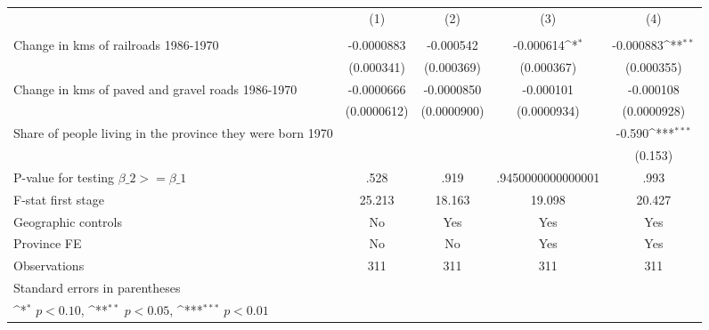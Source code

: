 {
\def\sym#1{\ifmmode^{#1}\else\(^{#1}\)\fi}
\begin{tabular}{l*{4}{c}}
\hline\hline
                &\multicolumn{1}{c}{(1)}&\multicolumn{1}{c}{(2)}&\multicolumn{1}{c}{(3)}&\multicolumn{1}{c}{(4)}\\
                &\multicolumn{1}{c}{}&\multicolumn{1}{c}{}&\multicolumn{1}{c}{}&\multicolumn{1}{c}{}\\
\hline
Change in kms of railroads 1986-1970&-0.0000883         &-0.000542         &-0.000614\sym{*}  &-0.000883\sym{**} \\
                &(0.000341)         &(0.000369)         &(0.000367)         &(0.000355)         \\
[1em]
Change in kms of paved and gravel roads 1986-1970&-0.0000666         &-0.0000850         &-0.000101         &-0.000108         \\
                &(0.0000612)         &(0.0000900)         &(0.0000934)         &(0.0000928)         \\
[1em]
Share of people living in the province they were born 1970&                  &                  &                  &   -0.590\sym{***}\\
                &                  &                  &                  &  (0.153)         \\
\hline
P-value for testing $\beta\_{2} >= \beta\_{1}$&     .528         &     .919         &.9450000000000001         &     .993         \\
F-stat first stage&   25.213         &   18.163         &   19.098         &   20.427         \\
Geographic controls&       No         &      Yes         &      Yes         &      Yes         \\
Province FE     &       No         &       No         &      Yes         &      Yes         \\
Observations    &      311         &      311         &      311         &      311         \\
\hline\hline
\multicolumn{5}{l}{\footnotesize Standard errors in parentheses}\\
\multicolumn{5}{l}{\footnotesize \sym{*} \(p<0.10\), \sym{**} \(p<0.05\), \sym{***} \(p<0.01\)}\\
\end{tabular}
}
